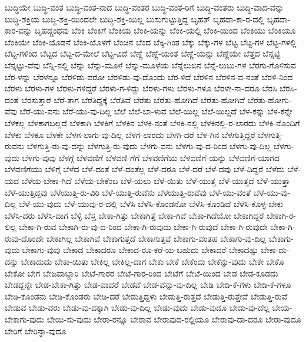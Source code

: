 {ಬುದ್ಧಿಯೇ
ಬುದ್ಧಿ-ವಂತ
ಬುದ್ಧಿ-ವಂತ-ನಾದ
ಬುದ್ಧಿ-ವಂತರ
ಬುದ್ಧಿ-ವಂತ-ರಿಗೆ
ಬುದ್ಧಿ-ವಂತರು
ಬುದ್ಧಿ-ವಾದ-ವನ್ನು
ಬುದ್ಧಿ-ಶಕ್ತಿಯ
ಬುದ್ಧಿ-ಶಕ್ತಿ-ಯಿಂದಲೇ
ಬುದ್ಧಿ-ಶಕ್ತಿ-ಯಿಲ್ಲ
ಬುಸುಗುಟ್ಟುತ್ತಿದ್ದ
ಬೃಹತ್
ಬೃಹದಾ-ಕಾ-ರ-ದಲ್ಲಿ
ಬೃಹದಾ-ಕಾರ-ವನ್ನು
ಬೃಹದ್ಗ್ರಂಥವು
ಬೆಂಕಿ
ಬೆಂಕಿಗೆ
ಬೆಂಕಿಯ
ಬೆಂಕಿ-ಯನ್ನು
ಬೆಂಕಿ-ಯಲ್ಲಿ
ಬೆಂಕಿ-ಯಿಂದ
ಬೆಂಕಿಯು
ಬೆಂಕಿಯೂ
ಬೆಂಕಿಯೇ
ಬೆಂಕಿ-ಯೊಡನೆ
ಬೆಂಕಿ-ಯೊಳಗೆ
ಬೆಂಚಿನ
ಬೆಂದ
ಬೆಕ್ಕಿ-ಗಿಂತ
ಬೆಕ್ಕು
ಬೆಕ್ಕು-ಗಳ
ಬೆಟ್ಟ
ಬೆಟ್ಟ-ಗಳ
ಬೆಟ್ಟ-ಗಳಲ್ಲಿ
ಬೆಟ್ಟ-ಗಳಿಂದ
ಬೆಟ್ಟದ
ಬೆಟ್ಟ-ದ-ಮೇಲೆ
ಬೆಟ್ಟ-ವಿದೆ
ಬೆಣ್ಣೆ
ಬೆಣ್ಣೆ-ಯಂತೆ
ಬೆಣ್ಣೆ-ಯನ್ನು
ಬೆಣ್ಣೆಯೇ
ಬೆತ್ತದ
ಬೆನ್ನಟ್ಟಿ
ಬೆನ್ನಟ್ಟು-ವೆವು
ಬೆನ್ನಿ-ನಲ್ಲಿ
ಬೆನ್ನು
ಬೆನ್ನು-ಮೂಳೆ
ಬೆನ್ನು-ಮೂಳೆಯ
ಬೆನ್ನೆಲುಬಿನ
ಬೆನ್ನೆ-ಲುಬು-ಗಳ
ಬೆರಗು-ಗೊಳಿಸುವ
ಬೆರ-ಳನ್ನು
ಬೆರಳನ್ನೂ
ಬೆರಳಿಡು-ವರೋ
ಬೆರಳಿಡು-ವು-ದೊಂದು
ಬೆರ-ಳಿದೆ
ಬೆರಳಿನ
ಬೆರಳಿನ-ವ-ನಂತೆ
ಬೆರಳಿ-ನಿಂದ
ಬೆರಳು
ಬೆರಳು-ಗಳ
ಬೆರಳು-ಗಳಿದ್ದರೆ
ಬೆರಳು-ಗ-ಳಿದ್ದು
ಬೆರಳು-ಗಳು
ಬೆರಳು-ಗಳೂ
ಬೆರಳೇ-ನಾ-ದರೂ
ಬೆರಸಿ
ಬೆರಸಿ-ದಂತೆ
ಬೆರಸುತ್ತಾರೆ
ಬೆರೆ-ತಾಗ
ಬೆರೆತಿದ್ದಕ್ಕೆ
ಬೆರೆತಿವೆ
ಬೆರೆತು
ಬೆರೆತು-ಹೋಗಿದೆ
ಬೆರೆತು-ಹೋಗಿವೆ
ಬೆರೆತು-ಹೋಗು-ವೆವು
ಬೆರೆ-ಯು-ವನು
ಬೆರೆ-ಯು-ವು-ದಿಲ್ಲ
ಬೆಲೆ
ಬೆಲೆ-ಬಾ-ಳುವ
ಬೆಲೆ-ಯಿಲ್ಲ
ಬೆಲೆ-ಯಿಲ್ಲದೆ
ಬೆಳ-ಕನ್ನು
ಬೆಳ-ಕನ್ನೇ
ಬೆಳಕಲ್ಲ
ಬೆಳಕಾಗಬಲ್ಲದೆ
ಬೆಳಕಾಗಿ
ಬೆಳಕಿಗೆ
ಬೆಳಕಿನ
ಬೆಳಕಿ-ನಂತೆ
ಬೆಳಕಿ-ನಲ್ಲಿ
ಬೆಳಕಿನಲ್ಲಿ-ರ-ಲಾರದು
ಬೆಳಕಿ-ನೊಂದಿಗೆ
ಬೆಳಕು
ಬೆಳಕೂ
ಬೆಳಕೇ
ಬೆಳಗ-ಲಾಗು-ವು-ದಿಲ್ಲ
ಬೆಳಗ-ಲಾರದು
ಬೆಳಗಿ-ದರೆ
ಬೆಳ-ಗಿನ
ಬೆಳಗುತ್ತಿದ್ದರೆ
ಬೆಳಗುತ್ತಿ-ರುವನು
ಬೆಳಗುತ್ತಿ-ರು-ವು-ದನ್ನು
ಬೆಳಗುತ್ತಿ-ರು-ವುದು
ಬೆಳಗು-ವನು
ಬೆಳಗು-ವು-ದ-ರಿಂದ
ಬೆಳಗು-ವು-ದಿಲ್ಲ
ಬೆಳಗು-ವುದು
ಬೆಳಗು-ವುವು
ಬೆಳಗ್ಗೆ
ಬೆಳವಣಿಗೆ
ಬೆಳವಣಿ-ಗೆಗೆ
ಬೆಳವಣಿಗೆಯ
ಬೆಳವಣಿಗೆ-ಯನ್ನು
ಬೆಳವಣಿಗೆ-ಯಾಗದ
ಬೆಳವಣಿಗೆಯು
ಬೆಳಿಗ್ಗೆ
ಬೆಳೆದ
ಬೆಳೆ-ದಂತೆ
ಬೆಳೆ-ದಂತೆಲ್ಲ
ಬೆಳೆ-ದರೂ
ಬೆಳೆ-ದರೆ
ಬೆಳೆ-ದವು
ಬೆಳೆ-ದಿದ್ದರೆ
ಬೆಳೆದು
ಬೆಳೆ-ಯದ
ಬೆಳೆಯ-ಬೇಕಾ-ಗಿದೆ
ಬೆಳೆಯ-ಬೇಕೆಂಬ
ಬೆಳೆ-ಯಲು
ಬೆಳೆ-ಯಿತು
ಬೆಳೆ-ಯುತ್ತ
ಬೆಳೆ-ಯುತ್ತದೆ
ಬೆಳೆ-ಯುತ್ತಾ
ಬೆಳೆ-ಯುತ್ತಿದ್ದವು
ಬೆಳೆಯುತ್ತಿ-ರು-ವಿರಿ
ಬೆಳೆ-ಯುತ್ತಿ-ರುವೆನು
ಬೆಳೆಯುತ್ತಿ-ರುವೆವು
ಬೆಳೆ-ಯು-ವಂತೆ
ಬೆಳೆ-ಯು-ವು-ದಿಲ್ಲ
ಬೆಳೆ-ಯು-ವುದು
ಬೆಳೆ-ಯುವು-ರ-ದಲ್ಲಿ
ಬೆಳೆಸಿ
ಬೆಳೆಸಿ-ಕೊಂಡನೋ
ಬೆಳೆಸಿ-ಕೊಂಡಿದೆ
ಬೆಳೆಸಿ-ಕೊಳ್ಳ-ಬೇಕು
ಬೆಳೆಸಿ-ದರು
ಬೆಳೆಸಿ-ದಾಗ
ಬೆಳ್ಳಿ
ಬೆಸ್ತ
ಬೇಕಾ-ಗಿತ್ತು
ಬೇಕಾಗಿತ್ತೆ
ಬೇಕಾ-ಗಿದೆ
ಬೇಕಾ-ಗಿದೆಯೋ
ಬೇಕಾಗಿದ್ದರೆ
ಬೇಕಾಗಿ-ರ-ಲಿಲ್ಲ
ಬೇಕಾ-ಗಿ-ರುವ
ಬೇಕಾಗಿ-ರು-ವು-ದ-ರಿಂದ
ಬೇಕಾ-ಗಿ-ರುವುದು
ಬೇಕಾ-ಗಿ-ರುವುದೆ
ಬೇಕಾ-ಗಿ-ರುವುದೇ
ಬೇಕಾ-ಗಿ-ರುವು-ದೊಂದೇ
ಬೇಕಾಗಿಲ್ಲ
ಬೇಕಾಗಿವೆ
ಬೇಕಾಗುತ್ತದೆ
ಬೇಕಾಗುತ್ತವೆ
ಬೇಕಾಗು-ವಂತಹ
ಬೇಕಾಗು-ವು-ದಿಲ್ಲ
ಬೇಕಾಗು-ವುದು
ಬೇಕಾಗು-ವುವು
ಬೇಕಾದ
ಬೇಕಾದರೂ
ಬೇಕಾದ-ರೂ-ಕರೆ-ಯ-ಬಹುದು
ಬೇಕಾದರೆ
ಬೇಕಾದಷ್ಟು
ಬೇಕಾ-ದು-ದನ್ನು
ಬೇಕಾದುದು
ಬೇಕಾ-ಯಿತು
ಬೇಕಿಲ್ಲ
ಬೇಕಿಲ್ಲ-ದಾಗ
ಬೇಕು
ಬೇಕೆ
ಬೇಕೆಂದು
ಬೇಕೆನ್ನು-ವುದು
ಬೇಕೇ
ಬೇಕೊ
ಬೇಕೋ
ಬೇಗ
ಬೇಜವಾಬ್ದಾರಿ
ಬೇಟೆ-ಗಾರರ
ಬೇಟೆ-ಗಾರ-ರಿಂದ
ಬೇಟೆಗೆ
ಬೇಟೆ-ಯಿಂದ
ಬೇಡ
ಬೇಡ-ಕೂಡದು
ಬೇಡದ್ದನ್ನೇ
ಬೇಡ-ಬೇಕಾ-ಗಿತ್ತು
ಬೇಡ-ವಾದರೆ
ಬೇಡವೆ
ಬೇಡ-ವೆನ್ನು-ವು-ದಿಲ್ಲ
ಬೇಡಿ
ಬೇಡಿ-ಕೆ-ಗಳು
ಬೇಡಿ-ಕೆ-ಗಳೂ
ಬೇಡಿ-ಕೊಂಡನು
ಬೇಡಿ-ಕೊಂಡರು
ಬೇಡಿ-ದರೆ
ಬೇಡುತ್ತಿದ್ದಳು
ಬೇಡುತ್ತಿ-ರುತ್ತದೆ
ಬೇಡುತ್ತಿ-ರುತ್ತೇವೆ
ಬೇಡುತ್ತಿ-ರುವೆ
ಬೇಡುವ
ಬೇಡು-ವರು
ಬೇಡು-ವು-ದಕ್ಕಾಗಿ
ಬೇಡು-ವು-ದಿಲ್ಲ
ಬೇಡು-ವುದು
ಬೇಡು-ವುದೂ
ಬೇಡು-ವು-ದೆಲ್ಲ
ಬೇಯ-ಬೇಕಾಗು-ವುದು
ಬೇಯಿ-ಸು-ವುದು
ಬೇರಾ-ರನ್ನೂ
ಬೇರಾವ
ಬೇರಾವುದ-ರಲ್ಲಿಯೂ
ಬೇರಾವು-ದಾ-ದರೂ
ಬೇರಾ-ವುದೂ
ಬೇರಿಗೆ
ಬೇರಿನ್ನಾ-ವುದೂ
}
